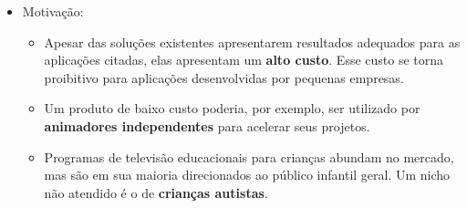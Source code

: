 \documentclass[brazil]{beamer}
\begin{document}
\begin{frame}
  \begin{itemize}
      \item Motivação:
      
      \begin{itemize}
      
        \item Apesar das soluções existentes apresentarem resultados adequados para as aplicações citadas, elas apresentam um \textbf{alto custo}. Esse custo se torna proibitivo para aplicações desenvolvidas por pequenas empresas.
        
        \item Um produto de baixo custo poderia, por exemplo, ser utilizado por \textbf{animadores independentes} para acelerar seus projetos.
        
        \item Programas de televisão educacionais para crianças abundam no mercado, mas são em sua maioria direcionados ao público infantil geral. Um nicho não atendido é o de
\textbf{crianças autistas}.
        
      \end{itemize}   
          
  \end{itemize} 

\end{frame}
\end{document}
